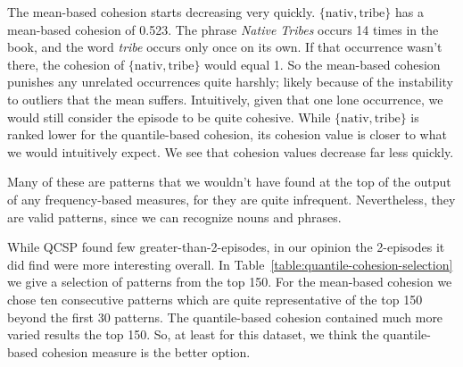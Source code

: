 The mean-based cohesion starts decreasing very quickly. $ \{ \text{nativ}, \text{tribe} \} $ has a mean-based cohesion of 0.523. The phrase \emph{Native Tribes} occurs 14 times in the book, and the word \emph{tribe} occurs only once on its own. If that occurrence wasn't there, the cohesion of $ \{ \text{nativ}, \text{tribe} \} $ would equal 1. So the mean-based cohesion punishes any unrelated occurrences quite harshly; likely because of the instability to outliers that the mean suffers. Intuitively, given that one lone occurrence, we would still consider the episode to be quite cohesive. While $ \{ \text{nativ}, \text{tribe} \} $ is ranked lower for the quantile-based cohesion, its cohesion value is closer to what we would intuitively expect. We see that cohesion values decrease far less quickly.

Many of these are patterns that we wouldn't have found at the top of the output of any frequency-based measures, for they are quite infrequent. Nevertheless, they are valid patterns, since we can recognize nouns and phrases.

While QCSP found few greater-than-2-episodes, in our opinion the 2-episodes it did find were more interesting overall. In Table~\ref{table:quantile-cohesion-selection} we give a selection of patterns from the top 150. For the mean-based cohesion we chose ten consecutive patterns which are quite representative of the top 150 beyond the first 30 patterns. The quantile-based cohesion contained much more varied results the top 150. So, at least for this dataset, we think the quantile-based cohesion measure is the better option.

